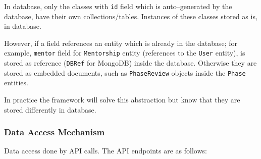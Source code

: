 \documentclass[10pt]{article}
\begin{document}
In database, only the classes with \texttt{id} field which is auto--generated by the 
database, have their own collections/tables. Instances of these classes stored as is,
in database.

However, if a field references an entity which is already in the database; for example,
\texttt{mentor} field for \texttt{Mentorship} entity (references to the \texttt{User}
entity), is stored as reference (\texttt{DBRef} for MongoDB) inside the database. 
Otherwise they are stored as embedded documents, such as \texttt{PhaseReview} objects
inside the \texttt{Phase} entities.

In practice the framework will solve this abstraction but know that they are stored
differently in database.


\subsubsection{Data Access Mechanism} \label{data_access_mechanism}
Data access done by API calls. The API endpoints are as follows:
\end{document}
